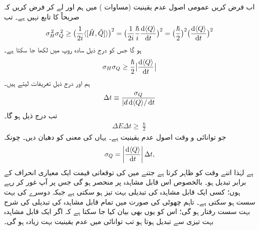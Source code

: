 اب فرض کریں  عمومی اصول  عدم یقینیت (مساوات )  میں ہم   اور  لے کر    فرض کریں کہ  صریحاً  کا تابع نہیں ہے۔ تب
\begin{align*}
\sigma_{H}^{\,2} \sigma_{Q}^{\,2} \geq \big( \frac{1}{2i} \langle [ \hat{H}, \hat{Q} ] \rangle \big)^{2} = \big( \frac{1}{2i} \frac{\hslash}{i} \frac{\dif \, \langle Q \rangle}{\dif t} \big)^{2} = \big( \frac{\hslash}{2} \big)^{2} \big( \frac{\dif\, \langle Q \rangle}{\dif t} \big)^{2} 
\end{align*}
ہو گا جس کو  درج ذیل سادہ روپ میں  لکھا جا سکتا ہے۔ 
\begin{align*}
\sigma_{H} \sigma_{Q} \geq \frac{\hslash}{2} \big | \frac{\dif \,\langle Q \rangle}{\dif t} \big| 
\end{align*}
ہم  اور  درج ذیل تعریفات لیتے ہیں۔
\begin{align}
\Delta t \equiv \frac{\sigma_{Q}}{|d\dif\, \langle Q \rangle / \dif t} 
\end{align}
تب درج ذیل ہو گا۔
\begin{align}\label{مساوات_قواعد_توانائی_و_وقت_اصول_عدم_یقینیت}
\Delta E \Delta t \geq \frac{\hslash}{2}
\end{align}
جو توانائی و وقت  اصول عدم یقینیت   ہے۔ یہاں  کی معنی کو دھیان دیں۔ چونکہ 
\begin{align*}
\sigma_{Q} = \left| \frac{\dif\, \langle Q \rangle}{\dif t} \right| \Delta t ,
\end{align*}
ہے لہٰذا  اتنے وقت کو ظاہر کرتا ہے جتنے میں  کی توقعاتی  قیمت ایک معیاری انحراف کے برابر تبدیل ہو۔ بالخصوص  اس قابل مشاہدہ  پر منحصر ہو گی جس پر آپ غور کر رہے ہوں؛  کسی ایک قابل مشاہدہ کی تبدیلی بہت تیز ہو سکتی ہے جبکہ دوسرے کی بہت سست ہو سکتی ہے۔ تاہم   چھوٹی  کی صورت میں تمام قابل مشاہدہ کی تبدیلی کی شرح بہت سست رفتار  ہو گی؛ اس کو یوں بھی بیان کیا جا سکتا ہے کہ اگر ایک قابل مشاہدہ بہت تیزی سے تبدیل ہوتا ہو  تب توانائی میں عدم یقینیت بہت زیادہ ہو گی۔


